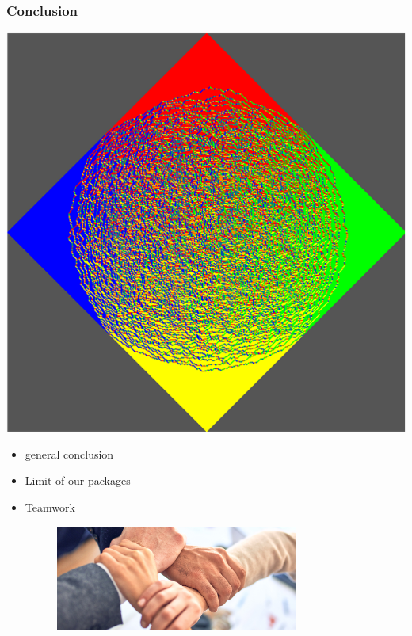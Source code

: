 \documentclass [xcolor=svgnames, t] {beamer}
\begin{document}
\begin{frame}
\frametitle{Conclusion}
\begin{center}
\includegraphics[scale=0.15]{aztecdiamond.png}
\end{center}

\begin{itemize}
\item general conclusion 
\item Limit of our packages

\item Teamwork
\begin{figure}[b]
\includegraphics[width=8cm]{hands-team-work.jpg}
\centering
\end{figure}
\end{itemize}
\end{frame}
\end{document}
